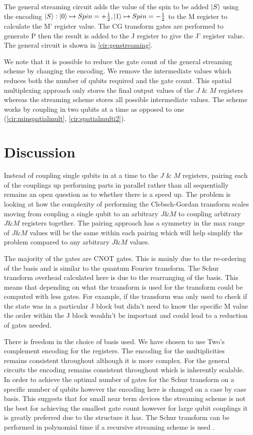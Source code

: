 \documentclass[12pt]{article}
\begin{document}
The general streaming circuit adds the value of the spin to be added $\left\vert{S}\right\rangle$ using the encoding $\left\vert{S}\right\rangle : \left\vert{0}\right\rangle \mapsto Spin = +\frac{1}{2}, \left\vert{1}\right\rangle \mapsto Spin = -\frac{1}{2}$ to the M register to calculate the M' register value. The CG transform gates are performed to generate P then the result is added to the J register to give the J' register value. The general circuit is shown in \autoref{cir:genstreaming}.

We note that it is possible to reduce the gate count of the general streaming scheme by changing the encoding. We remove the intermediate values which reduces both the number of qubits required and the gate count. This spatial multiplexing approach only stores the final output values of the $J$ \& $M$ registers whereas the streaming scheme stores all possible intermediate values. The scheme works by coupling in two qubits at a time as opposed to one (\autoref{cir:minspatialmult}, \autoref{cir:spatialmulti2}). 

\section{Discussion}

Instead of coupling single qubits in at a time to the $J$ \& $M$ registers, pairing each of the couplings up performing parts in parallel rather than all sequentially remains an open question as to whether there is a speed up. The problem is looking at how the complexity of performing the Clebsch-Gordan transform scales moving from coupling a single qubit to an arbitrary $J \& M$ to coupling arbitrary $J \& M$ registers together. The pairing approach has a symmetry in the max range of $J \& M$ values will be the same within each pairing which will help simplify the problem compared to any arbitrary $J \& M$ values.

The majority of the gates are CNOT gates. This is mainly due to the re-ordering of the basis and is similar to the quantum Fourier transform. The Schur transform overhead calculated here is due to the rearranging of the basis. This means that depending on what the transform is used for the transform could be computed with less gates. For example, if the transform was only used to check if the state was in a particular J block but didn't need to know the specific M value the order within the J block wouldn't be important and could lead to a reduction of gates needed.

There is freedom in the choice of basis used. We have chosen to use Two's complement encoding for the registers. The encoding for the multiplicities remains consistent throughout although it is more complex. For the general circuits the encoding remains consistent throughout which is inherently scalable. In order to achieve the optimal number of gates for the Schur transform on a specific number of qubits however the encoding here is changed on a case by case basis. This suggests that for small near term devices the streaming scheme is not the best for achieving the smallest gate count however for large qubit couplings it is greatly preferred due to the structure it has. The Schur transform can be performed in polynomial time if a recursive streaming scheme is used \cite{bacon2007quantum}. 
\end{document}
